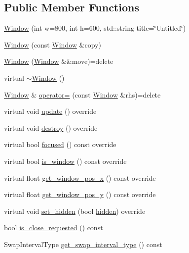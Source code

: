 \subsection*{Public Member Functions}
\begin{DoxyCompactItemize}
\item 
\mbox{\hyperlink{class_window_a0799cc50a89cc6d5e1cd98e71791200d}{Window}} (int w=800, int h=600, std\+::string title=\char`\"{}Untitled\char`\"{})
\item 
\mbox{\hyperlink{class_window_a8ffc0093a40fa9c91f060818444ce4a1}{Window}} (const \mbox{\hyperlink{class_window}{Window}} \&copy)
\item 
\mbox{\hyperlink{class_window_aa4086debceb557ecb6443cce32b41f9b}{Window}} (\mbox{\hyperlink{class_window}{Window}} \&\&move)=delete
\item 
virtual \mbox{\hyperlink{class_window_a245d821e6016fa1f6970ccbbedd635f6}{$\sim$\+Window}} ()
\item 
\mbox{\hyperlink{class_window}{Window}} \& \mbox{\hyperlink{class_window_a96e2d69af0539f4a45c04cf54803f5ec}{operator=}} (const \mbox{\hyperlink{class_window}{Window}} \&rhs)=delete
\item 
virtual void \mbox{\hyperlink{class_window_aa63a9a2404cebe562174a851f2dc8a01}{update}} () override
\item 
virtual void \mbox{\hyperlink{class_window_ac11084e8bd2b61ba1a45266a9a4a0b57}{destroy}} () override
\item 
virtual bool \mbox{\hyperlink{class_window_af79c5fde03ed3825e0459a267ea01dee}{focused}} () const override
\item 
virtual bool \mbox{\hyperlink{class_window_a43a34a3321d0a9bd30dbba747af14c6a}{is\+\_\+window}} () const override
\item 
virtual float \mbox{\hyperlink{class_window_ab2af2ee909ac87876fd043acfe7611ca}{get\+\_\+window\+\_\+pos\+\_\+x}} () const override
\item 
virtual float \mbox{\hyperlink{class_window_a950ef0cfbccf484315041162942c4ecc}{get\+\_\+window\+\_\+pos\+\_\+y}} () const override
\item 
virtual void \mbox{\hyperlink{class_window_ae70c9e2fddb5224f884291b6d8225fe4}{set\+\_\+hidden}} (bool \mbox{\hyperlink{class_g_u_i_a270e03faf2f4612883700dc89ec7e0d0}{hidden}}) override
\item 
bool \mbox{\hyperlink{class_window_a95d3193d85c5f8ffed21eeef995602f7}{is\+\_\+close\+\_\+requested}} () const
\item 
Swap\+Interval\+Type \mbox{\hyperlink{class_window_a73b7959b6435d574d5ddbb6115153724}{get\+\_\+swap\+\_\+interval\+\_\+type}} () const

\end{DoxyCompactItemize}
